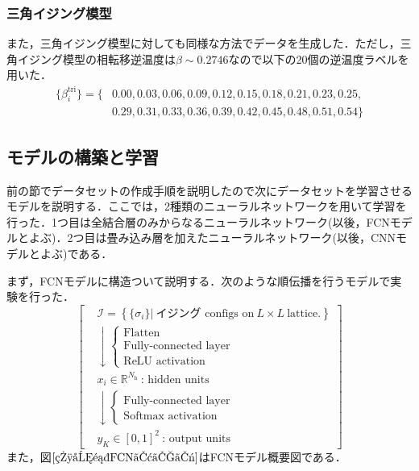\documentclass[a4paper,11pt]{jsreport}
\begin{document}
\subsubsection*{三角イジング模型}
また，三角イジング模型に対しても同様な方法でデータを生成した．ただし，三角イジング模型の相転移逆温度は$\beta \sim 0.2746$なので以下の20個の逆温度ラベルを用いた．
\begin{align*}
  \{\beta_i^{\text{tri}}\} 
  = \{ &0.00,0.03,0.06,0.09,0.12,0.15,0.18,0.21,0.23,0.25,\\
  &0.29,0.31,0.33,0.36,0.39,0.42,0.45,0.48,0.51,0.54 \}
\end{align*}

\subsection{モデルの構築と学習}
前の節でデータセットの作成手順を説明したので次にデータセットを学習させるモデルを説明する．ここでは，2種類のニューラルネットワークを用いて学習を行った．1つ目は全結合層のみからなるニューラルネットワーク(以後，FCNモデルとよぶ)．2つ目は畳み込み層を加えたニューラルネットワーク(以後，CNNモデルとよぶ)である．\par
まず，FCNモデルに構造ついて説明する．次のような順伝播を行うモデルで実験を行った．
\begin{equation}
  \left[
    \begin{aligned}
      & \mathcal{I} = \left\{ \{ \sigma_i \} \Big| \ \text{イジング configs on} \ L \times L \ \text{lattice.} \right\} \\
       & \downarrow
      \begin{cases}
        \text{Flatten} \\
        \text{Fully-connected layer} \\
        \text{ReLU activation}
      \end{cases} \\
       & x_i \in \mathbb{R}^{N_{\text{h}}} \ \text{: hidden units} \\
       & \downarrow
      \begin{cases}
        \text{Fully-connected layer} \\
        \text{Softmax activation}
      \end{cases} \\
       & y_K \in [0,1]^{2} \ \text{: output units}
    \end{aligned}
    \right]
\end{equation}
また，図$\ref{相分類FCNモデル}$はFCNモデル概要図である．
\end{document}
